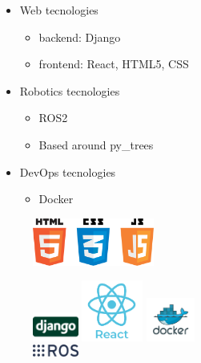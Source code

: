 \documentclass[notes,slidesec,a4]{seminar}
\begin{document}
\begin{hslide}
\begin{minipage}[t]{7cm}
    \begin{itemize}
    \item Web tecnologies
      \begin{itemize}
      \item backend: Django
      \item frontend: React, HTML5, CSS
      \end{itemize}
    \item Robotics tecnologies
      \begin{itemize}
      \item ROS2
      \item Based around py\_trees
      \end{itemize}
    \item DevOps tecnologies
      \begin{itemize}
      \item Docker
      \end{itemize}
    \end{itemize}
\end{minipage}
\begin{minipage}[t]{5cm}
  \begin{figure}
    \centerline{\includegraphics[width=4cm]{figs/html5.png}}
    \includegraphics[width=1.5cm]{figs/Django-Logo.png}
    \includegraphics[width=2cm]{figs/react-logo.png}
    \includegraphics[width=1.6cm]{figs/docker-logo.png}\\
    \includegraphics[width=1.5cm]{figs/Ros-logo.png}
  \end{figure}
\end{minipage}



\end{hslide}
\end{document}
